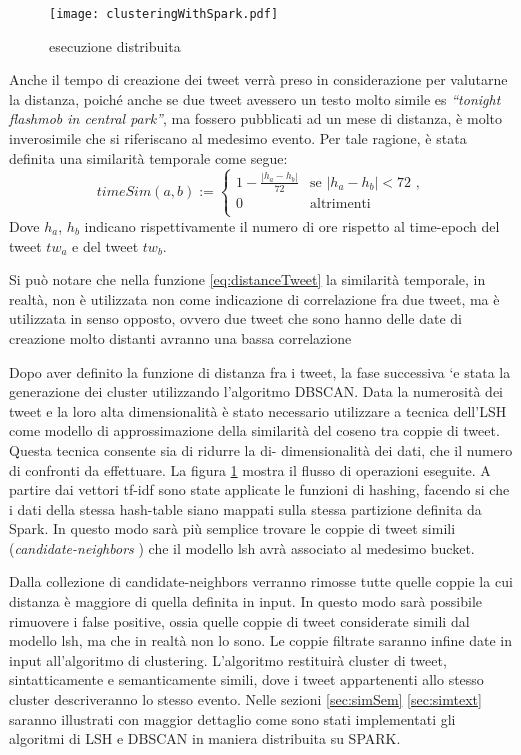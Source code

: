  \begin{figure}[h]
    \centering
    \texttt{[image: clusteringWithSpark.pdf]}
    \caption{esecuzione distribuita}
    \label{fig:clusteringWithSpark}
\end{figure}  

 
 Anche il tempo di creazione dei tweet verrà preso in considerazione per valutarne la distanza, poiché anche se due tweet avessero un testo molto simile es \emph{“tonight  flashmob in central park”}, ma fossero pubblicati ad un mese di distanza, è molto inverosimile che si riferiscano al medesimo evento. Per tale ragione, è stata definita una similarità temporale come segue:
\begin{equation} 
\label{eq:timeSim}
timeSim(a,b):=\begin{cases}
1-\frac{|h_a-h_b|}{72} & \text{se $|h_a-h_b|<72 $  ,}\\
0 & \text{altrimenti}\\
\end{cases}
\end{equation}
Dove $h_a$, $h_b$ indicano rispettivamente il numero di ore rispetto al time-epoch del tweet $tw_a$ e del tweet $tw_b$.

Si può notare che nella funzione \ref{eq:distanceTweet} la similarità  temporale, in realtà, non  è
utilizzata non come indicazione di correlazione fra due tweet, ma è utilizzata
in senso opposto, ovvero due tweet che sono hanno delle date di creazione molto distanti avranno una bassa correlazione

Dopo aver definito la funzione di distanza fra i tweet, la fase successiva `e
stata la generazione dei cluster utilizzando l'algoritmo DBSCAN. Data la
numerosità dei tweet e la loro alta dimensionalità  è stato necessario utilizzare 
a tecnica dell’LSH come modello di approssimazione della similarità
del coseno tra coppie di tweet. Questa tecnica consente sia di ridurre la di-
dimensionalità dei dati, che il numero di confronti da effettuare. La figura \ref{fig:clusteringWithSpark}
mostra il flusso di operazioni eseguite. A partire dai vettori tf-idf sono state
applicate le funzioni di hashing, facendo si che i dati della stessa hash-table
siano mappati sulla stessa partizione definita da Spark. In questo modo sarà
più semplice trovare le coppie di tweet simili (\emph{candidate-neighbors} ) che il
modello lsh avrà associato al medesimo bucket.

Dalla collezione di candidate-neighbors verranno rimosse tutte quelle coppie
la cui distanza è maggiore di quella definita in input. In questo modo sarà
possibile rimuovere i false positive, ossia quelle coppie di tweet considerate
simili dal modello lsh, ma che in realtà non lo sono.
Le coppie filtrate saranno infine date in input all'algoritmo di clustering.
L'algoritmo restituirà cluster di tweet, sintatticamente e semanticamente
simili, dove i tweet appartenenti allo stesso cluster descriveranno lo stesso
evento.
Nelle sezioni \ref{sec:simSem} \ref{sec:simtext} saranno illustrati con maggior dettaglio come sono stati implementati gli algoritmi di LSH e DBSCAN in maniera distribuita su SPARK.

